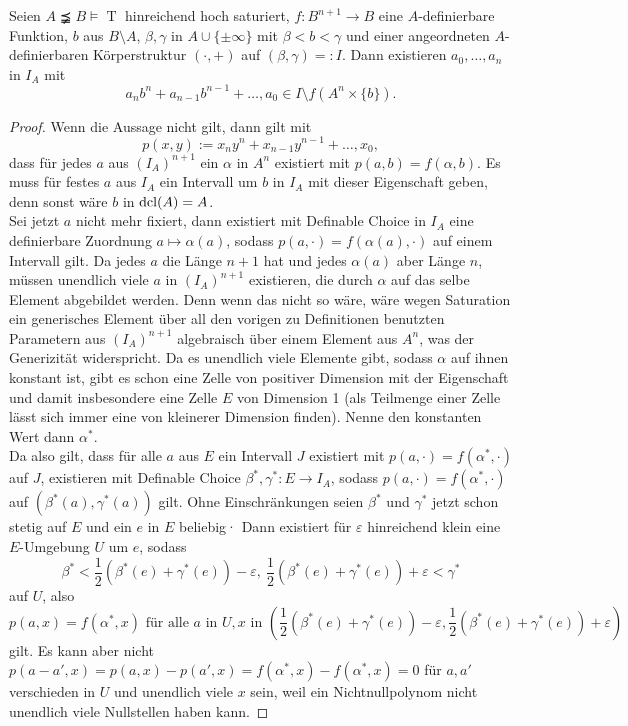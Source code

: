 \begin{lemma}\label{Hilfsaussage Kleinheit}
	Seien $A\precneqq B\models\operatorname{T}$ hinreichend hoch saturiert, $f:B^{n+1}\rightarrow B$ eine $A$-definierbare Funktion, $b$ aus $B\setminus A$, $\beta,\gamma$ in $A\cup\{\pm\infty\}$ mit $\beta<b<\gamma$ und einer angeordneten $A$-definierbaren Körperstruktur $(\cdot,+)$ auf $(\beta,\gamma)=:I$. Dann existieren $a_0,\dots,a_n$ in $I_A$ mit $$a_nb^n+a_{n-1}b^{n-1}+\dots,a_0\in I\setminus f(A^n\times\{b\}).$$
\end{lemma}
\newpage
\begin{proof}
	Wenn die Aussage nicht gilt, dann gilt mit $$p(x,y):=x_ny^n+x_{n-1}y^{n-1}+\dots,x_0,$$ dass für jedes $a$ aus $(I_A)^{n+1}$ ein $\alpha$ in $A^n$ existiert mit $p(a,b)=f(\alpha,b)$. Es muss für festes $a$ aus $I_A$ ein Intervall um $b$ in $I_A$ mit dieser Eigenschaft geben, denn sonst wäre $b$ in $\operatorname{dcl}(A)=A$.\\
	Sei jetzt $a$ nicht mehr fixiert, dann existiert mit Definable Choice in $I_A$ eine definierbare Zuordnung $a\mapsto\alpha(a)$, sodass $p(a,\cdot)=f(\alpha(a),\cdot)$ auf einem Intervall gilt. Da jedes $a$ die Länge $n+1$ hat und jedes $\alpha(a)$ aber Länge $n$, müssen unendlich viele $a$ in $(I_A)^{n+1}$ existieren, die durch $\alpha$ auf das selbe Element abgebildet werden. Denn wenn das nicht so wäre, wäre wegen Saturation ein generisches Element über all den vorigen zu Definitionen benutzten Parametern aus $(I_A)^{n+1}$ algebraisch über einem Element aus $A^n$, was der Generizität widerspricht. Da es unendlich viele Elemente gibt, sodass $\alpha$ auf ihnen konstant ist, gibt es schon eine Zelle von positiver Dimension mit der Eigenschaft und damit insbesondere eine Zelle $E$ von Dimension 1 (als Teilmenge einer Zelle lässt sich immer eine von kleinerer Dimension finden). Nenne den konstanten Wert dann $\alpha^*$.\\
	Da also gilt, dass für alle $a$ aus $E$ ein Intervall $J$ existiert mit $p(a,\cdot)=f(\alpha^*,\cdot)$ auf $J$, existieren mit Definable Choice $\beta^*,\gamma^*:E\rightarrow I_A$, sodass $p(a,\cdot)=f(\alpha^*,\cdot)$ auf $(\beta^*(a),\gamma^*(a))$ gilt. Ohne Einschränkungen seien $\beta^*$ und $\gamma^*$ jetzt schon stetig auf $E$ und ein $e$ in $E$ beliebig· Dann existiert für $\varepsilon$ hinreichend klein eine $E$-Umgebung $U$ um $e$, sodass $$\beta^*<\frac{1}{2}(\beta^*(e)+\gamma^*(e))-\varepsilon,\ \frac{1}{2}(\beta^*(e)+\gamma^*(e))+\varepsilon<\gamma^*$$ auf $U$, also $$p(a,x)=f(\alpha^*,x)\text{ für alle }a\text{ in } U,x\text{ in }(\frac{1}{2}(\beta^*(e)+\gamma^*(e))-\varepsilon,\frac{1}{2}(\beta^*(e)+\gamma^*(e))+\varepsilon)$$ gilt. Es kann aber nicht $p(a-a',x)=p(a,x)-p(a',x)=f(\alpha^*,x)-f(\alpha^*,x)=0$ für $a,a'$ verschieden in $U$ und unendlich viele $x$ sein, weil ein Nichtnullpolynom nicht unendlich viele Nullstellen haben kann.
\end{proof}

